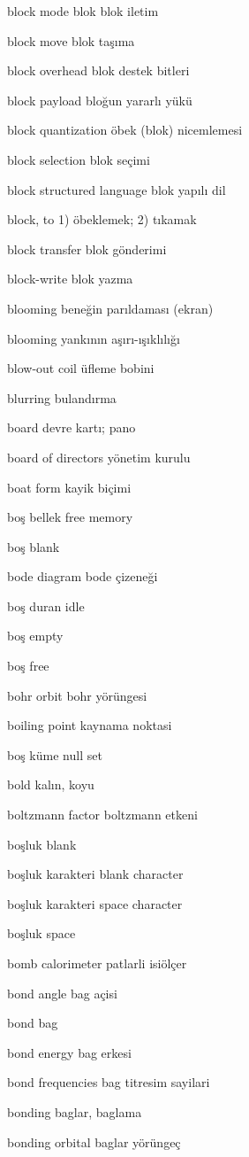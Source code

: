 \documentclass[12pt,fleqn]{article}\usepackage{../../common}
\begin{document}
block mode blok blok iletim

block move blok taşıma

block overhead blok destek bitleri

block payload bloğun yararlı yükü

block quantization öbek (blok) nicemlemesi

block selection blok seçimi

block structured language blok yapılı dil

block, to 1) öbeklemek; 2) tıkamak

block transfer blok gönderimi

block-write blok yazma

blooming beneğin parıldaması (ekran)

blooming yankının aşırı-ışıklılığı

blow-out coil üfleme bobini

blurring bulandırma

board devre kartı; pano

board of directors yönetim kurulu

boat form kayik biçimi

boş bellek free memory

boş blank

bode diagram bode çizeneği

boş duran idle

boş empty

boş free

bohr orbit bohr yörüngesi

boiling point kaynama noktasi

boş küme null set

bold kalın, koyu

boltzmann factor boltzmann etkeni

boşluk blank

boşluk karakteri blank character

boşluk karakteri space character

boşluk space

bomb calorimeter patlarli isiölçer

bond angle bag açisi

bond bag

bond energy bag erkesi

bond frequencies bag titresim sayilari

bonding baglar, baglama

bonding orbital baglar yörüngeç
\end{document}
